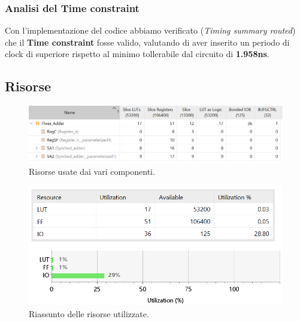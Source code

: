 \documentclass[12pt]{article}
\begin{document}
        \subsubsection{Analisi del Time constraint}
            Con l'implementazione del codice abbiamo verificato (\textit{Timing summary routed}) che il \textbf{Time constraint} fosse valido, valutando di aver inserito un periodo di clock di superiore rispetto al minimo tollerabile dal circuito di \textbf{1.958ns}.
            \newpage

        \subsection{Risorse}
            \begin{figure}[ht]
                \centering
                \includegraphics[scale=0.8]{Risorse_1.png}
                \caption{Risorse usate dai vari componenti.}
            \end{figure}

            \begin{figure}[ht]
                \centering
                \includegraphics[scale=0.8]{Risorse_2.png}
                \caption{Riassunto delle risorse utilizzate.}
            \end{figure}
            \newpage
\end{document}
